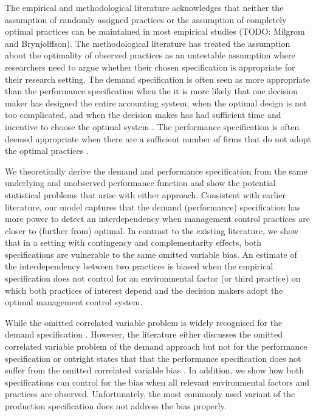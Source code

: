 \documentclass[12pt]{article}
\begin{document}
The empirical and methodological literature acknowledges that neither the assumption of randomly assigned practices or the assumption of completely optimal practices can be maintained in most empirical studies (TODO: Milgrom and Brynjolffson). The methodological literature has treated the assumption about the optimality of observed practices as an untestable assumption where researchers need to argue whether their chosen specification is appropriate for their research setting. The demand specification is often seen as more appropriate than the performance specification when the it is more likely that one decision maker has designed the entire accounting system, when the optimal design is not too complicated, and when the decision makes has had sufficient time and incentive to choose the optimal system \citep{Grabner2013, hofmann2017organizational, Carree2011, Johansson2018}.  The performance specification is often deemed appropriate when there are a sufficient number of firms that do not adopt the optimal practices \citep{Carree2011, Bedford2016}. 

We theoretically derive the demand and performance specification from the same underlying and unobserved performance function and show the potential statistical problems that arise with either approach. Consistent with earlier literature, our model captures that the demand (performance) specification has more power to detect an interdependency when management control practices are closer to (further from) optimal. In contrast to the existing literature, we show that in a setting with contingency and complementarity effects, both specifications are vulnerable to the same omitted variable bias. An estimate of the interdependency between two practices is biased when the empirical specification does not control for an environmental factor (or third practice) on which both practices of interest depend and the decision makers adopt the optimal management control system. 

 While the omitted correlated variable problem is widely recognised for the demand specification \citep{Grabner2013, Arora1996, hofmann2017organizational}. However, the literature either discusses the omitted correlated variable problem of the demand approach but not for the performance specification \citep{Grabner2013,hofmann2017organizational} or outright states that that the performance specification does not suffer from the omitted correlated variable bias \citep{Carree2011}.  In addition, we show how both specifications can control for the bias when all relevant environmental factors and practices are observed. Unfortunately, the most commonly used variant of the production specification does not address the bias properly.
\end{document}
